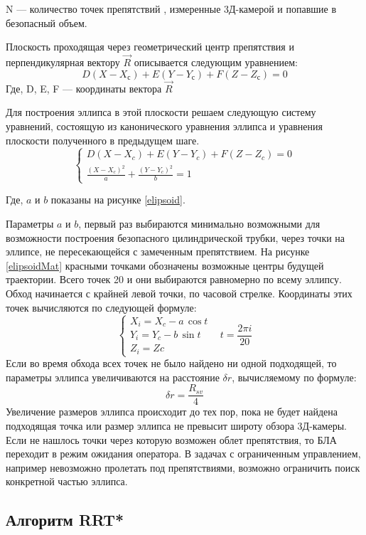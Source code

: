 N --- количество точек препятствий , измеренные 3Д-камерой и попавшие в безопасный объем.

Плоскость проходящая через геометрический центр препятствия и перпендикулярная вектору $\vec{R}$ описывается следующим уравнением:
$$
D(X-X_с)+E(Y-Y_с)+F(Z-Z_с)=0
$$
Где, D, E, F --- координаты вектора $\vec{R}$

Для построения эллипса в этой плоскости решаем следующую систему уравнений, состоящую из канонического уравнения эллипса и уравнения плоскости полученного в предыдущем шаге.
$$
{\begin{cases} 
	D(X - X_c)+E(Y-Y_c)+F(Z-Z_c)=0\\
	\frac{(X-X_c)^{2}}{a}+\frac{(Y-Y_c)^{2}}{b}=1
 \end{cases}}
$$

Где, $a$ и $b$ показаны на рисунке \ref{elipsoid}.

Параметры $a$ и $b$, первый раз выбираются минимально возможными для возможности построения безопасного цилиндрической трубки, через точки на эллипсе, не пересекающейся с замеченным препятствием.
На рисунке \ref{elipsoidMat} красными точками обозначены возможные центры будущей траектории.
Всего точек 20 и они выбираются равномерно по всему эллипсу.
Обход начинается с крайней левой точки, по часовой стрелке.
Координаты этих точек вычисляются по следующей формуле:
$$
{\begin{cases}X_i=X_c-a\,\cos t\\Y_i=Y_c-b\,\sin t\\Z_i=Zc\end{cases}}\;\;\; t =\frac{2\pi i}{20} 
$$
Если во время обхода всех точек не было найдено ни одной подходящей, то параметры эллипса увеличиваются на расстояние $\delta r$, вычисляемому по формуле:
$$
\delta r = \frac{R_{sv}}{4}
$$
Увеличение размеров эллипса происходит до тех пор, пока не будет найдена подходящая точка или размер эллипса не превысит широту обзора 3Д-камеры.
Если не нашлось точки через которую возможен облет препятствия, то БЛА переходит в режим ожидания оператора.
В задачах с ограниченным управлением, например невозможно пролетать под препятствиями, возможно ограничить поиск конкретной частью эллипса.

\subsection{Алгоритм RRT*}


